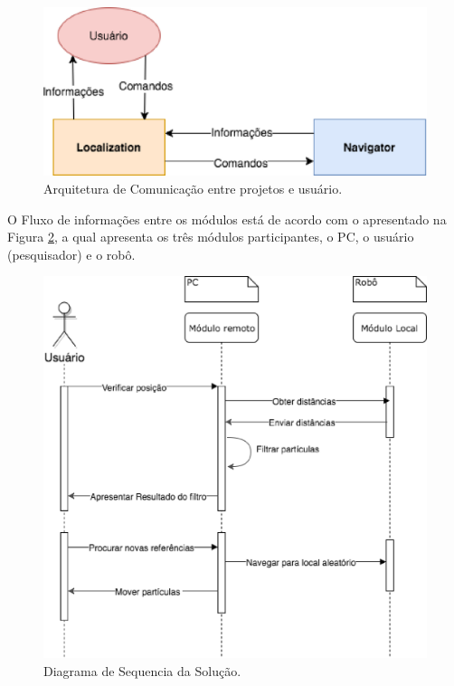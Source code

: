 	\begin{figure}[H]
		\centering
		\includegraphics[scale=0.8]{figuras/arq_pc.eps}
		\caption[Arquitetura de Comunicação]{Arquitetura de Comunicação entre projetos e usuário.}
		\label{img:arq_pc}
	\end{figure}

	O Fluxo de informações entre os módulos está de acordo com o apresentado na Figura \ref{img:sequencia}, a qual apresenta
	os três módulos participantes, o PC, o usuário (pesquisador) e o robô.

	\begin{figure}[H]
		\centering
		\includegraphics[scale=0.8]{figuras/sequencia.eps}
		\caption[Diagrama de Sequencia da Solução]{Diagrama de Sequencia da Solução.}
		\label{img:sequencia}
	\end{figure}

